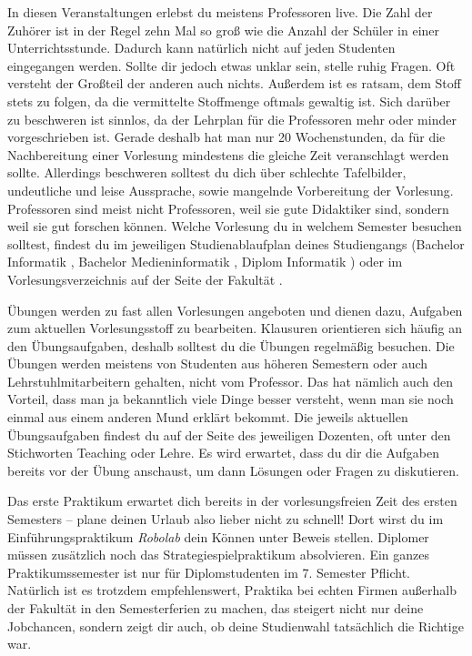 In diesen Veranstaltungen erlebst du meistens Professoren live.
Die Zahl der Zuhörer ist in der Regel zehn Mal so groß wie die Anzahl der Schüler in einer Unterrichtsstunde. Dadurch kann natürlich nicht auf jeden Studenten eingegangen werden.
Sollte dir jedoch etwas unklar sein, stelle ruhig Fragen. Oft versteht der Großteil der anderen auch nichts.
Außerdem ist es ratsam, dem Stoff stets zu folgen, da die vermittelte Stoffmenge oftmals gewaltig ist. Sich darüber zu beschweren ist sinnlos, da der Lehrplan für die Professoren mehr oder minder vorgeschrieben ist.
Gerade deshalb hat man nur 20 Wochenstunden, da für die Nachbereitung einer Vorlesung mindestens die gleiche Zeit veranschlagt werden sollte.
Allerdings beschweren solltest du dich über schlechte Tafelbilder, undeutliche und leise Aussprache, sowie mangelnde Vorbereitung der Vorlesung.
Professoren sind meist nicht Professoren, weil sie gute Didaktiker sind, sondern weil sie gut forschen können.
Welche Vorlesung du in welchem Semester besuchen solltest, findest du im jeweiligen Studienablaufplan deines Studiengangs
(Bachelor Informatik , Bachelor Medieninformatik , Diplom Informatik ) oder im Vorlesungsverzeichnis auf der Seite der Fakultät .



Übungen werden zu fast allen Vorlesungen angeboten und dienen dazu, Aufgaben zum aktuellen Vorlesungsstoff zu bearbeiten. Klausuren orientieren sich häufig an den Übungsaufgaben, deshalb solltest du die Übungen
regelmäßig besuchen. Die Übungen werden meistens von Studenten aus höheren Semestern oder auch Lehrstuhlmitarbeitern gehalten, nicht vom Professor.
Das hat nämlich auch den Vorteil, dass man ja bekanntlich viele Dinge besser versteht, wenn man sie noch einmal aus einem anderen Mund erklärt bekommt.
Die jeweils aktuellen Übungsaufgaben findest du auf der Seite des jeweiligen Dozenten, oft unter den Stichworten Teaching oder Lehre.
Es wird erwartet, dass du dir die Aufgaben bereits vor der Übung anschaust, um dann Lösungen oder Fragen zu diskutieren.



Das erste Praktikum erwartet dich bereits in der vorlesungsfreien Zeit des ersten Semesters – plane deinen Urlaub also lieber nicht zu schnell!
Dort wirst du im Einführungspraktikum \textit{Robolab} dein Können unter Beweis stellen. Diplomer müssen zusätzlich noch das Strategiespielpraktikum absolvieren.
Ein ganzes Praktikumssemester ist nur für Diplomstudenten im 7. Semester Pflicht.
Natürlich ist es trotzdem empfehlenswert, Praktika bei echten Firmen außerhalb der Fakultät in den Semesterferien zu machen, das steigert nicht nur deine Jobchancen,
sondern zeigt dir auch, ob deine Studienwahl tatsächlich die Richtige war.

